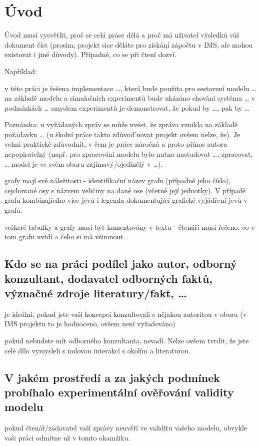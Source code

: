 \documentclass{scrartcl}
\begin{document}
\section{Úvod}
\label{sec-1}
Úvod musí vysvětlit, proč se celá práce dělá a proč má uživatel výsledků váš
dokument číst (prosím, projekt sice děláte pro získání zápočtu v IMS, ale mohou
existovat i jiné důvody). Případně, co se při čtení dozví.

Například:

v této práci je řešena implementace \ldots{}, která bude použita pro sestavení modelu
\ldots{}  na základě modelu a simulačních experimentů bude ukázáno chování systému
\ldots{} v podmínkách \ldots{}  smyslem experimentů je demonstrovat, že pokud by \ldots{}, pak
by \ldots{}

Poznámka: u vyžádaných zpráv se může uvést, že zpráva vznikla na základě
požadavku \ldots{} (u školní práce takto zdůvod'novat projekt ovšem nelze, že). Je
velmi praktické zdůvodnit, v čem je práce náročná a proto přínos autora
nepopiratelný (např. pro zpracování modelu bylo nutno nastudovat \ldots{}, zpracovat,
\ldots{} model je ve svém oboru zajímavý/ojedinělý v \ldots{}).

grafy mají své náležitosti - identifikační název grafu (případně jeho číslo),
cejchované osy s názvem veličiny na dané ose (včetně její jednotky). V případě
grafu kombinujícího více jevů i legenda dokumentující grafické vyjádření jevů v
grafu.

veškeré tabulky a grafy musí být komentovány v textu - čtenáři musí
řečeno, co v tom grafu uvidí a čeho si má všimnout.

\subsection{Kdo se na práci podílel jako autor, odborný konzultant, dodavatel odborných faktů, význačné zdroje literatury/fakt, \ldots{}}
\label{sec-1-1}
je ideální, pokud jste vaši koncepci konzultovali s nějakou autoritou v oboru (v
IMS projektu to je hodnoceno, ovšem není vyžadováno)

pokud nebudete mít odborného konzultanta, nevadí. Nelze ovšem tvrdit, že jste
celé dílo vymysleli s nulovou interakcí s okolím a literaturou.
\subsection{V jakém prostředí a za jakých podmínek probíhalo experimentální ověřování validity modelu}
\label{sec-1-2}
pokud čtenář/zadavatel vaší zprávy neuvěří ve validitu vašeho modelu, obvykle
vaši práci odmítne už v tomto okamžiku.
\end{document}
